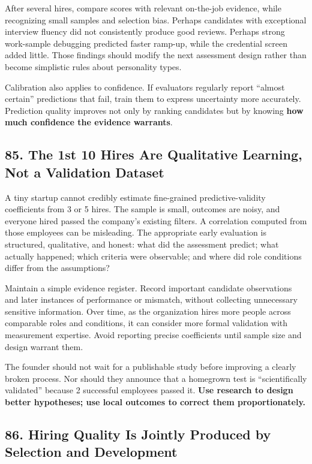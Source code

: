 After several hires, compare scores with relevant on-the-job evidence, while recognizing small samples and selection bias. Perhaps candidates with exceptional interview fluency did not consistently produce good reviews. Perhaps strong work-sample debugging predicted faster ramp-up, while the credential screen added little. Those findings should modify the next assessment design rather than become simplistic rules about personality types.

Calibration also applies to confidence. If evaluators regularly report ``almost certain'' predictions that fail, train them to express uncertainty more accurately. Prediction quality improves not only by ranking candidates but by knowing \textbf{how much confidence the evidence warrants}.

\subsection*{85. The 1st 10 Hires Are Qualitative Learning, Not a Validation Dataset}

A tiny startup cannot credibly estimate fine-grained predictive-validity coefficients from 3 or 5 hires. The sample is small, outcomes are noisy, and everyone hired passed the company's existing filters. A correlation computed from those employees can be misleading. The appropriate early evaluation is structured, qualitative, and honest: what did the assessment predict; what actually happened; which criteria were observable; and where did role conditions differ from the assumptions?

Maintain a simple evidence register. Record important candidate observations and later instances of performance or mismatch, without collecting unnecessary sensitive information. Over time, as the organization hires more people across comparable roles and conditions, it can consider more formal validation with measurement expertise. Avoid reporting precise coefficients until sample size and design warrant them.

The founder should not wait for a publishable study before improving a clearly broken process. Nor should they announce that a homegrown test is ``scientifically validated'' because 2 successful employees passed it. \textbf{Use research to design better hypotheses; use local outcomes to correct them proportionately.}

\subsection*{86. Hiring Quality Is Jointly Produced by Selection and Development}

